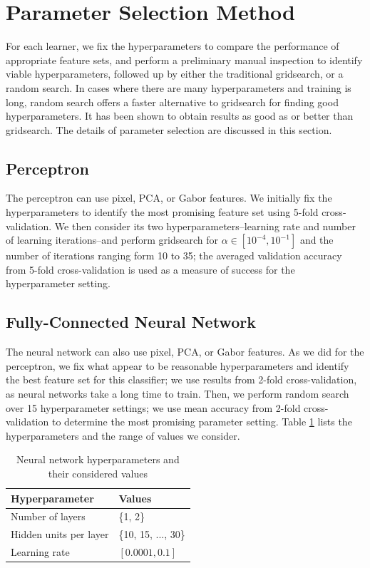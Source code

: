 \documentclass{acm_proc_article-sp}
\begin{document}
\section{Parameter Selection Method}%
For each learner, we fix the hyperparameters to compare the performance of appropriate feature sets, and perform a preliminary manual inspection to identify viable hyperparameters, followed up by either the traditional gridsearch, or a random search. In cases where there are many hyperparameters and training is long, random search offers a faster alternative to gridsearch for finding good hyperparameters. It has been shown to obtain results as good as or better than gridsearch\cite{Bergstra}. The details of parameter selection are discussed in this section.

\subsection{Perceptron}
The perceptron can use pixel, PCA, or Gabor features. We initially fix the hyperparameters to identify the most promising feature set using 5-fold cross-validation. We then consider its two hyperparameters--learning rate and number of learning iterations--and perform gridsearch for $\alpha \in [10^{-4},10^{-1}]$ and the number of iterations ranging form 10 to 35; the averaged validation accuracy from 5-fold cross-validation is used as a measure of success for the hyperparameter setting. 

\subsection{Fully-Connected Neural Network}
The neural network can also use pixel, PCA, or Gabor features. As we did for the perceptron, we fix what appear to be reasonable hyperparameters and identify the best feature set for this classifier; we use results from 2-fold cross-validation, as neural networks take a long time to train. Then, we perform random search over 15 hyperparameter settings; we use mean accuracy from 2-fold cross-validation to determine the most promising parameter setting. Table \ref{tab:nn-hyp} lists the hyperparameters and the range of values we consider.
\begin{table}[h!]
  \centering
  \begin{tabular}{|l|l|}
    \hline 
    {\bfseries Hyperparameter} & {\bfseries Values}\\
    \hline \hline
    Number of layers & \{1, 2\} \\
    Hidden units per layer & \{10, 15, ..., 30\} \\
    Learning rate & $[0.0001, 0.1]$ \\
    \hline
  \end{tabular}
  \caption{Neural network hyperparameters and their considered values}
  \label{tab:nn-hyp}
\end{table}
\end{document}
